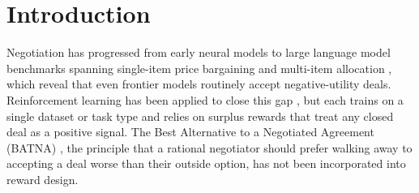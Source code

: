 \documentclass[11pt]{article}
\begin{document}
\section{Introduction}

Negotiation has progressed from early neural models \citep{lewis2017deal, he2018decoupling} to large language model \citep[LLM;][]{minaee2024llmsurvey} benchmarks spanning single-item price bargaining and multi-item allocation \citep{xia2024measuring, kwon2024llmseffectivenegotiators, bianchi2024negotiationarena, noh2024personalities, chatterjee2024agreemate, hua2024gametheoretic}, which reveal that even frontier models routinely accept negative-utility deals. Reinforcement learning has been applied to close this gap \citep{liu2026instructing, bergemann2026bilateral, vendrell2026gametalk, zeng2025repo, long2025evoemo, oh2026merit}, but each trains on a single dataset or task type and relies on surplus rewards that treat any closed deal as a positive signal. The Best Alternative to a Negotiated Agreement (BATNA) \citep{fisher1981gettingtoyes}, the principle that a rational negotiator should prefer walking away to accepting a deal worse than their outside option, has not been incorporated into reward design.
\end{document}
